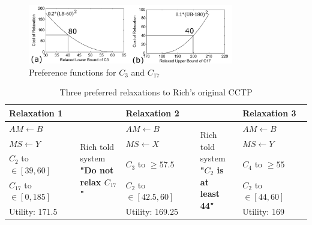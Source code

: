 \documentclass[jair,twoside,11pt,theapa]{article}
\begin{document}
\begin{figure}[h!]
	\centering
	\includegraphics[width=0.80\textwidth]{figures/sample_pref.pdf}  
	\caption{Preference functions for $C_3$ and $C_{17}$}
	\label{fig:sample_pref1}
\end{figure}



\begin{table}[h!]
	\centering
	\begin{tabular}{| p{3cm} | p{1.8cm} | p{3cm} | p{1.8cm} | p{3cm} |}
		\hline
		\textbf{Relaxation 1} & & \textbf{Relaxation 2} & & \textbf{Relaxation 3} \\
		\hline
		$AM \leftarrow B$ &  \multirow{5}{*}{\parbox{2cm}{Rich told\\ system\\ \textbf{"Do not\\ relax $C_{17}$"}}}  & $AM \leftarrow B$ & \multirow{5}{*}{\parbox{2cm}{Rich told\\ system\\ \textbf{"$C_{2}$ is at\\ least 44"}}}  & $AM \leftarrow B$ \\
		$MS \leftarrow Y$ & & $MS \leftarrow X$ & & $MS \leftarrow Y$ \\
		$C_2$ to $\in[39,60]$ & & $C_3$ to $\geq57.5$ & & $C_4$ to $\geq55$ \\
		$C_{17}$ to $\in[0,185]$ & & $C_2$ to $\in[42.5,60]$ & & $C_2$ to $\in[44,60]$ \\
		Utility: 171.5 & & Utility: 169.25 & & Utility: 169 \\
		\hline
	\end{tabular}
	\caption{Three preferred relaxations to Rich's original CCTP}
	\label{table:relaxations}
\end{table}

%
\end{document}
